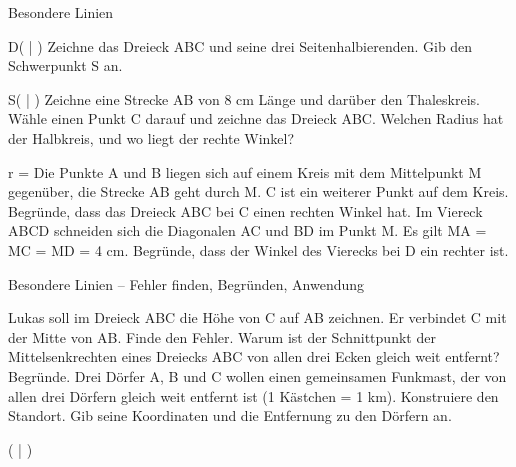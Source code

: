 \begin{aufgabe}{Besondere Linien}
\begin{teile}
\begin{ksys}[xmin=0,xmax=10,ymin=0,ymax=8]    \end{ksys}
D( \leerfeld | \leerfeld )
\teil Zeichne das Dreieck ABC und seine drei Seitenhalbierenden. Gib den Schwerpunkt S an.

\begin{ksys}[xmin=0,xmax=10,ymin=0,ymax=8]    \end{ksys}
S( \leerfeld | \leerfeld )
\teil Zeichne eine Strecke AB von 8 cm Länge und darüber den Thaleskreis. Wähle einen Punkt C darauf und zeichne das Dreieck ABC. Welchen Radius hat der Halbkreis, und wo liegt der rechte Winkel?

\winkelstrahl[10][A]
r = \leerfeld[cm]
\teil Die Punkte A und B liegen sich auf einem Kreis mit dem Mittelpunkt M gegenüber, die Strecke AB geht durch M. C ist ein weiterer Punkt auf dem Kreis. Begründe, dass das Dreieck ABC bei C einen rechten Winkel hat.
\teil Im Viereck ABCD schneiden sich die Diagonalen AC und BD im Punkt M. Es gilt MA = MC = MD = 4 cm. Begründe, dass der Winkel des Vierecks bei D ein rechter ist.
\end{teile}
\end{aufgabe}

\begin{aufgabe}{Besondere Linien – Fehler finden, Begründen, Anwendung}
\begin{teile}
\teil Lukas soll im Dreieck ABC die Höhe von C auf AB zeichnen. Er verbindet C mit der Mitte von AB. Finde den Fehler.
\teil Warum ist der Schnittpunkt der Mittelsenkrechten eines Dreiecks ABC von allen drei Ecken gleich weit entfernt? Begründe.
\teil Drei Dörfer A, B und C wollen einen gemeinsamen Funkmast, der von allen drei Dörfern gleich weit entfernt ist (1 Kästchen = 1 km). Konstruiere den Standort. Gib seine Koordinaten und die Entfernung zu den Dörfern an.

\begin{ksys}[xmin=0,xmax=10,ymin=0,ymax=8]    \end{ksys}
( \leerfeld | \leerfeld )
\end{teile}
\end{aufgabe}
